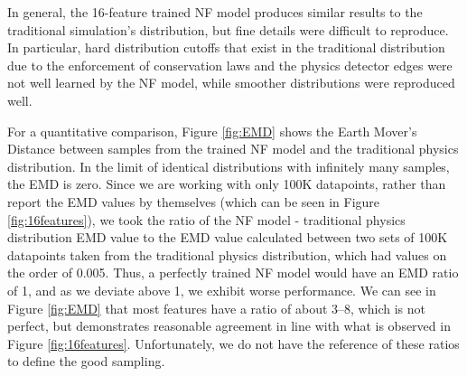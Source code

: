 \documentclass[conference]{IEEEtran}
\begin{document}
In general, the 16-feature trained NF model produces similar results to the traditional simulation's distribution, but fine details were difficult to reproduce. In particular, hard distribution cutoffs that exist in the traditional distribution due to the enforcement of conservation laws and the physics detector edges were not well learned by the NF model, while smoother distributions were reproduced well.

For a quantitative comparison, Figure \ref{fig:EMD} shows the Earth Mover's Distance between samples from the trained NF model and the traditional physics distribution. In the limit of identical distributions with infinitely many samples, the EMD is zero. Since we are working with only 100K datapoints, rather than report the EMD values by themselves (which can be seen in Figure \ref{fig:16features}), we took the ratio of the NF model - traditional physics distribution EMD value to the EMD value calculated between two sets of 100K datapoints taken from the traditional physics distribution, which had values on the order of 0.005. Thus, a perfectly trained NF model would have an EMD ratio of 1, and as we deviate above 1, we exhibit worse performance. We can see in Figure \ref{fig:EMD} that most features have a ratio of about 3--8, which is not perfect, but demonstrates reasonable agreement in line with what is observed in Figure \ref{fig:16features}. Unfortunately, we do not have the reference of these ratios to define the good sampling.
\end{document}
